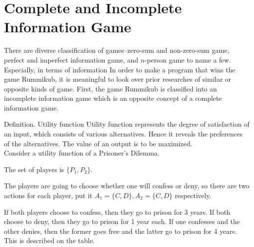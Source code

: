 \documentclass[11pt]{article}
\begin{document}
	
	
	\section{Complete and Incomplete Information Game}\label{section-information}
	There are diverse classification of games--zero-sum and non-zero-sum game, perfect and imperfect information game, and $n$-person game to name a few. Especially, in terms of information
	In order to make a program that wins the game Rummikub, it is meaningful to look over prior researches of similar or opposite kinds of game. First, the game Rummikub is classified into an incomplete information game which is an opposite concept of a complete information game. 
	
	
	Definition. Utility function
	Utility function represents the degree of satisfaction of an input, which consists of various alternatives. Hence it reveals the preferences of the alternatives. The value of an output is to be maximized.\\
	Consider a utility function of a Prisoner's Dilemma.
	
	The set of players is $\{P_1, P_2\}$.
	
	The players are going to choose whether one will confess or deny, so there are two actions for each player, put it $A_1=\{C,D\}, A_2=\{C,D\}$ respectively.
	
	If both players choose to confess, then they go to prison for 3 years. If both choose to deny, then they go to prison for 1 year each. If one confesses and the other denies, then the former goes free and the latter go to prison for 4 years. This is described on the table.
	
\end{document}
